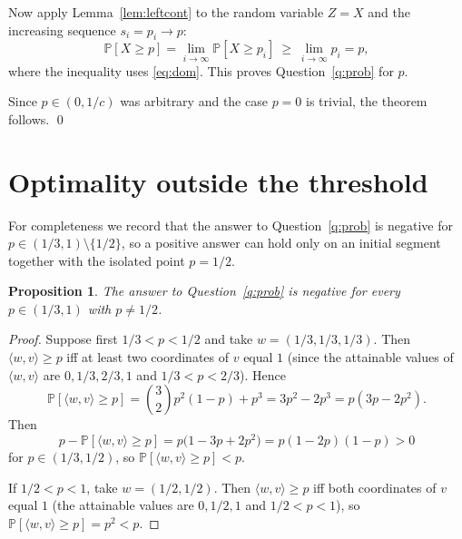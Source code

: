 \documentclass[11pt]{amsart}
\theoremstyle{plain}
\newtheorem{proposition}[theorem]{Proposition}
\def\Pb{\mathbb{P}}
\begin{document}
Now apply Lemma~\ref{lem:leftcont} to the random variable $Z=X$ and the increasing
sequence $s_i=p_i\to p$:
\[
\Pb[X\ge p]=\lim_{i\to\infty}\Pb[X\ge p_i]\ \ge\ \lim_{i\to\infty}p_i=p ,
\]
where the inequality uses \eqref{eq:dom}. This proves Question~\ref{q:prob} for
$p$.

Since $p\in(0,1/c)$ was arbitrary and the case $p=0$ is trivial, the theorem
follows. \qed

\section{Optimality outside the threshold}

For completeness we record that the answer to Question~\ref{q:prob} is negative
for $p\in(1/3,1)\setminus\{1/2\}$, so a positive answer can hold only on an initial
segment together with the isolated point $p=1/2$.

\begin{proposition}\label{prop:counterexample}
The answer to Question~\ref{q:prob} is negative for every $p\in(1/3,1)$ with
$p\ne1/2$.
\end{proposition}

\begin{proof}
Suppose first $1/3<p<1/2$ and take $w=(1/3,1/3,1/3)$. Then
$\langle w,v\rangle\ge p$ iff at least two coordinates of $v$ equal $1$ (since the
attainable values of $\langle w,v\rangle$ are $0,1/3,2/3,1$ and $1/3<p<2/3$).
Hence
\[
\Pb[\langle w,v\rangle\ge p]=\binom{3}{2}p^2(1-p)+p^3=3p^2-2p^3=p(3p-2p^2).
\]
Then
\[
p-\Pb[\langle w,v\rangle\ge p]=p\big(1-3p+2p^2\big)=p(1-2p)(1-p)>0
\]
for $p\in(1/3,1/2)$, so $\Pb[\langle w,v\rangle\ge p]<p$.

If $1/2<p<1$, take $w=(1/2,1/2)$. Then $\langle w,v\rangle\ge p$ iff both
coordinates of $v$ equal $1$ (the attainable values are $0,1/2,1$ and $1/2<p<1$),
so $\Pb[\langle w,v\rangle\ge p]=p^2<p$.
\end{proof}
\end{document}

